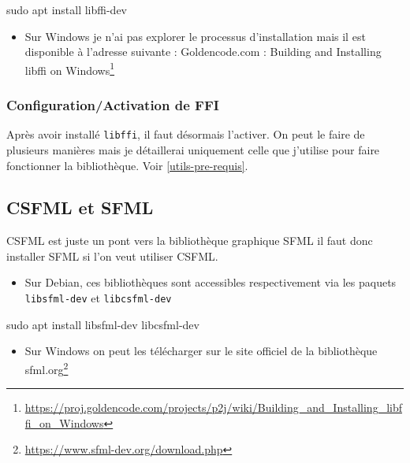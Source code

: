 \documentclass[11pt,a4paper,krantz2,11pt,oneside]{krantz}
\newenvironment{Shaded}{\begin{snugshade}}{\end{snugshade}}
\newcommand{\FunctionTok}[1]{\textcolor[rgb]{0,0,0}{#1}}
\newcommand{\NormalTok}[1]{#1}
\providecommand{\tightlist}{%
  \setlength{\itemsep}{0pt}\setlength{\parskip}{0pt}}
\renewcommand{\href}[2]{#2\footnote{\url{#1}}}
\begin{document}
\begin{Shaded}
\begin{Highlighting}[]
\FunctionTok{sudo}\NormalTok{ apt install libffi-dev}
\end{Highlighting}
\end{Shaded}

\begin{itemize}
\tightlist
\item
  Sur Windows je n'ai pas explorer le processus d'installation mais il est disponible à l'adresse suivante : \href{https://proj.goldencode.com/projects/p2j/wiki/Building_and_Installing_libffi_on_Windows}{Goldencode.com : Building and Installing libffi on Windows}
\end{itemize}

\hypertarget{configurationactivation-de-ffi}{%
\subsubsection{Configuration/Activation de FFI}\label{configurationactivation-de-ffi}}

Après avoir installé \texttt{libffi}, il faut désormais l'activer. On peut le faire de plusieurs manières mais je détaillerai uniquement celle que j'utilise pour faire fonctionner la bibliothèque. Voir \ref{utils-pre-requis}.

\hypertarget{csfml-et-sfml}{%
\subsection{CSFML et SFML}\label{csfml-et-sfml}}

CSFML est juste un pont vers la bibliothèque graphique SFML il faut donc installer SFML si l'on veut utiliser CSFML.

\begin{itemize}
\tightlist
\item
  Sur Debian, ces bibliothèques sont accessibles respectivement via les paquets \texttt{libsfml-dev} et \texttt{libcsfml-dev}
\end{itemize}

\begin{Shaded}
\begin{Highlighting}[]
\FunctionTok{sudo}\NormalTok{ apt install libsfml-dev libcsfml-dev}
\end{Highlighting}
\end{Shaded}

\begin{itemize}
\tightlist
\item
  Sur Windows on peut les télécharger sur le site officiel de la bibliothèque \href{https://www.sfml-dev.org/download.php}{sfml.org}
\end{itemize}
\end{document}
